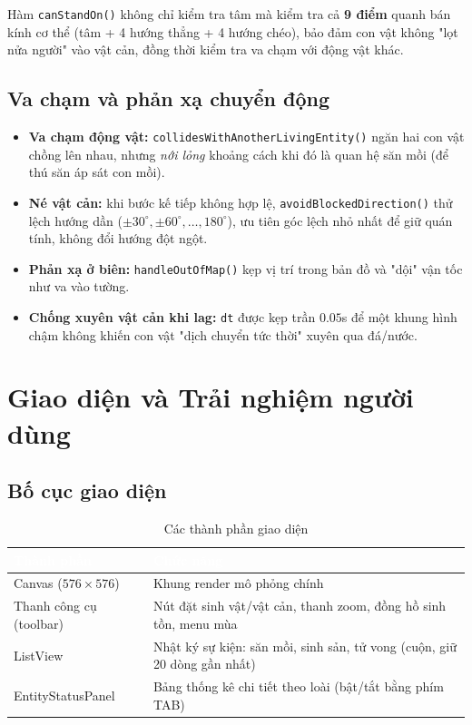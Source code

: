 \documentclass[12pt,a4paper]{report}
\newcommand{\keyword}[1]{\textcolor{primaryblue}{\textbf{#1}}}
\newcommand{\code}[1]{\texttt{\small #1}}
\begin{document}
Hàm \code{canStandOn()} không chỉ kiểm tra tâm mà kiểm tra cả \keyword{9 điểm} quanh bán kính cơ thể (tâm + 4 hướng thẳng + 4 hướng chéo), bảo đảm con vật không "lọt nửa người" vào vật cản, đồng thời kiểm tra va chạm với động vật khác.

\section{Va chạm và phản xạ chuyển động}

\begin{itemize}[leftmargin=1.5em]
    \item \keyword{Va chạm động vật:} \code{collidesWithAnotherLivingEntity()} ngăn hai con vật chồng lên nhau, nhưng \textit{nới lỏng} khoảng cách khi đó là quan hệ săn mồi (để thú săn áp sát con mồi).
    \item \keyword{Né vật cản:} khi bước kế tiếp không hợp lệ, \code{avoidBlockedDirection()} thử lệch hướng dần ($\pm30^\circ, \pm60^\circ, \dots, 180^\circ$), ưu tiên góc lệch nhỏ nhất để giữ quán tính, không đổi hướng đột ngột.
    \item \keyword{Phản xạ ở biên:} \code{handleOutOfMap()} kẹp vị trí trong bản đồ và "dội" vận tốc như va vào tường.
    \item \keyword{Chống xuyên vật cản khi lag:} \code{dt} được kẹp trần $0.05$s để một khung hình chậm không khiến con vật "dịch chuyển tức thời" xuyên qua đá/nước.
\end{itemize}

\chapter{Giao diện và Trải nghiệm người dùng}

\section{Bố cục giao diện}

\begin{table}[H]
\centering
\caption{Các thành phần giao diện}
\begin{tabular}{L{4cm} L{8cm}}
\toprule
{}
\textcolor{white}{\textbf{Thành phần}} & \textcolor{white}{\textbf{Chức năng}} \\
\midrule
Canvas ($576\times576$) & Khung render mô phỏng chính \\
 Thanh công cụ (toolbar) & Nút đặt sinh vật/vật cản, thanh zoom, đồng hồ sinh tồn, menu mùa \\
ListView & Nhật ký sự kiện: săn mồi, sinh sản, tử vong (cuộn, giữ 20 dòng gần nhất) \\
 EntityStatusPanel & Bảng thống kê chi tiết theo loài (bật/tắt bằng phím TAB) \\
\bottomrule
\end{tabular}
\end{table}
\end{document}
